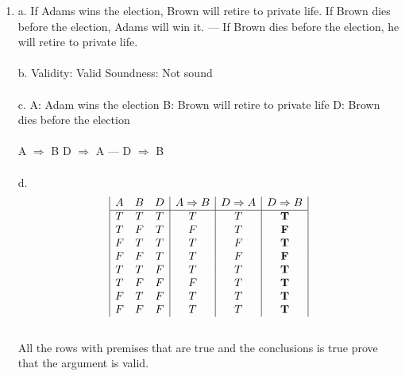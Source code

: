 \documentclass[]{article}
\begin{document}
\begin{enumerate}
    
    \item a.
    \newline If Adams wins the election, Brown will retire to private life.
    \newline
    If Brown dies before the election, Adams will win it.
    \newline
    ---
    \newline
    If Brown dies before the election, he will retire to private life.
    \\\\b.
    Validity: Valid
    \newline
    Soundness: Not sound
    \\\\c.
    \newline A: Adam wins the election
    \newline B: Brown will retire to private life
    \newline D: Brown dies before the election
    \\\\ A $\Rightarrow$ B
    \newline D $\Rightarrow$ A
    \newline ---
    \newline D $\Rightarrow $ B
    \\\\d.
    \begin{displaymath}
    \begin{array}{|c c c|c|c|c|}
    A & B & D & A \Rightarrow B & D \Rightarrow A & D \Rightarrow B\\ %
    \hline %
    T & T & T & T & T & \textbf{T}\\
    T & F & T & F & T & \textbf{F}\\
    F & T & T & T & F & \textbf{T}\\
    F & F & T & T & F & \textbf{F}\\
    T & T & F & T & T & \textbf{T}\\
    T & F & F & F & T & \textbf{T}\\
    F & T & F & T & T & \textbf{T}\\
    F & F & F & T & T & \textbf{T}\\
    \end{array}
    \end{displaymath}
    \\All the rows with premises that are true and the conclusions is true prove that the argument is valid.
    

\end{enumerate}
\end{document}

